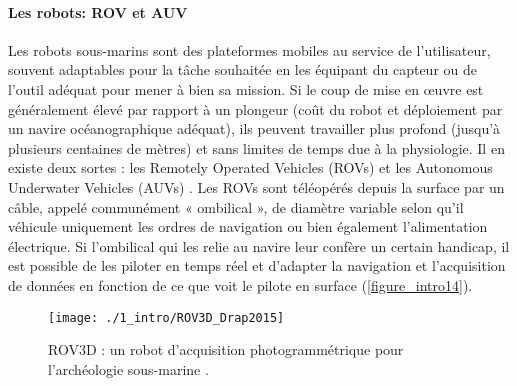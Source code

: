 \setlength{\fboxsep}{5pt}
\setlength{\fboxrule}{0.6pt}
\noindent{}

\paragraph{Les robots: ROV et AUV}

Les robots sous-marins sont des plateformes mobiles au service de l’utilisateur, souvent adaptables pour la tâche souhaitée en les équipant du capteur ou de l’outil adéquat pour mener à bien sa mission. Si le coup de mise en œuvre est généralement élevé par rapport à un plongeur (coût du robot et déploiement par un navire océanographique adéquat), ils peuvent travailler plus profond (jusqu’à plusieurs centaines de mètres) et sans limites de temps due à la physiologie. Il en existe deux sortes : les Remotely Operated Vehicles (ROVs) et les Autonomous Underwater Vehicles (AUVs) \citep{bogue_underwater_2015}. Les ROVs sont téléopérés depuis la surface par un câble, appelé communément « ombilical », de diamètre variable selon qu’il véhicule uniquement les ordres de navigation ou bien également l’alimentation électrique. Si l’ombilical qui les relie au navire leur confère un certain handicap, il est possible de les piloter en temps réel et d’adapter la navigation et l’acquisition de données en fonction de ce que voit le pilote en surface (\autoref{figure_intro14}).

\begin{figure}[H]
	\begin{center}
	\texttt{[image: ./1\_intro/ROV3D\_Drap2015]}
		\caption[ROV3D : un robot d’acquisition photogrammétrique pour l’archéologie sous-marine]{ROV3D : un robot d’acquisition photogrammétrique pour l’archéologie sous-marine \citep{drap_rov_2015}.}
	\label{figure_intro14}
\end{center}
\end{figure}

